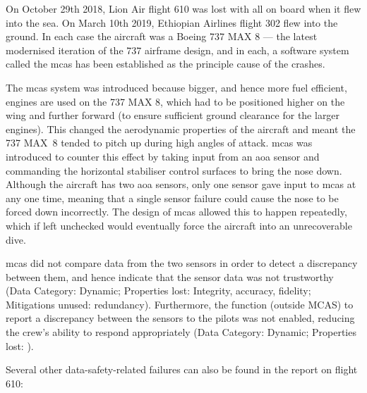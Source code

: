 On October 29th 2018, Lion Air flight 610 was lost with all on board when it flew into the sea. On March 10th 2019, Ethiopian Airlines flight 302 flew into the ground. In each case the aircraft was a Boeing 737 MAX 8 --- the latest modernised iteration of the 737 airframe design, and in each, a software system called the \gls{mcas} has been established as the principle cause of the crashes.

The \gls{mcas} system was introduced because bigger, and hence more fuel efficient, engines are used on the 737 MAX 8, which had to be positioned higher on the wing and further forward (to ensure sufficient ground clearance for the larger engines). This changed the aerodynamic properties of the aircraft and meant the 737 MAX~8 tended to pitch up during high angles of attack. \Gls{mcas} was introduced to counter this effect by taking input from an \gls{aoa} sensor and commanding the horizontal stabiliser control surfaces to bring the nose down. Although the aircraft has two \gls{aoa} sensors, only one sensor gave input to \gls{mcas} at any one time, meaning that a single sensor failure could cause the nose to be forced down incorrectly. The design of \gls{mcas} allowed this to happen repeatedly, which if left unchecked would eventually force the aircraft into an unrecoverable dive.

\Gls{mcas} did not compare data from the two sensors in order to detect a discrepancy between them, and hence indicate that the sensor data was not trustworthy (Data Category: Dynamic; Properties lost: Integrity, \gls{accuracy}, \gls{fidelity}; Mitigations unused: redundancy). Furthermore, the function (outside MCAS) to report a discrepancy between the sensors to the pilots was not enabled, reducing the crew's ability to respond appropriately (Data Category: Dynamic; Properties lost: ).

Several other data-safety-related failures can also be found in the report on flight 610:

